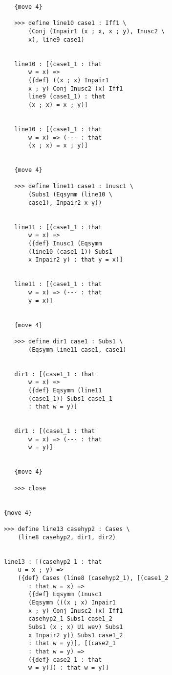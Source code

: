 \documentclass[12pt]{article}
\begin{document}
\begin{verbatim}
               {move 4}

               >>> define line10 case1 : Iff1 \
                   (Conj (Inpair1 (x ; x, x ; y), Inusc2 \
                   x), line9 case1)


               line10 : [(case1_1 : that 
                   w = x) => 
                   ({def} ((x ; x) Inpair1 
                   x ; y) Conj Inusc2 (x) Iff1 
                   line9 (case1_1) : that 
                   (x ; x) = x ; y)]


               line10 : [(case1_1 : that 
                   w = x) => (--- : that 
                   (x ; x) = x ; y)]


               {move 4}

               >>> define line11 case1 : Inusc1 \
                   (Subs1 (Eqsymm (line10 \
                   case1), Inpair2 x y))


               line11 : [(case1_1 : that 
                   w = x) => 
                   ({def} Inusc1 (Eqsymm 
                   (line10 (case1_1)) Subs1 
                   x Inpair2 y) : that y = x)]


               line11 : [(case1_1 : that 
                   w = x) => (--- : that 
                   y = x)]


               {move 4}

               >>> define dir1 case1 : Subs1 \
                   (Eqsymm line11 case1, case1)


               dir1 : [(case1_1 : that 
                   w = x) => 
                   ({def} Eqsymm (line11 
                   (case1_1)) Subs1 case1_1 
                   : that w = y)]


               dir1 : [(case1_1 : that 
                   w = x) => (--- : that 
                   w = y)]


               {move 4}

               >>> close


            {move 4}

            >>> define line13 casehyp2 : Cases \
                (line8 casehyp2, dir1, dir2)


            line13 : [(casehyp2_1 : that 
                u = x ; y) => 
                ({def} Cases (line8 (casehyp2_1), [(case1_2 
                   : that w = x) => 
                   ({def} Eqsymm (Inusc1 
                   (Eqsymm (((x ; x) Inpair1 
                   x ; y) Conj Inusc2 (x) Iff1 
                   casehyp2_1 Subs1 case1_2 
                   Subs1 (x ; x) Ui wev) Subs1 
                   x Inpair2 y)) Subs1 case1_2 
                   : that w = y)], [(case2_1 
                   : that w = y) => 
                   ({def} case2_1 : that 
                   w = y)]) : that w = y)]



\end{verbatim}
\end{document}
